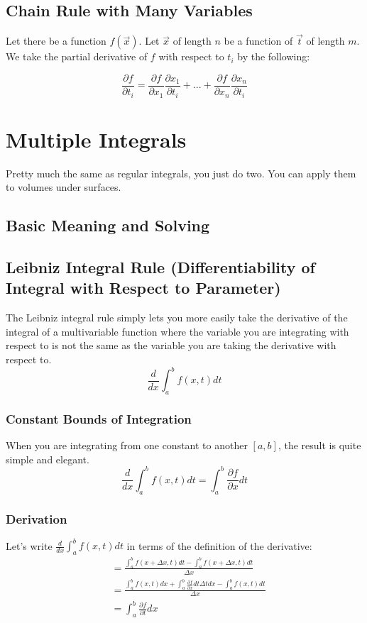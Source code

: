 \documentclass[a4paper,12pt]{report}
\begin{document}
\section{Chain Rule with Many Variables}
Let there be a function $f(\vec{x})$. Let $\vec{x}$ of length $n$ be a function of $\vec{t}$ of length $m$. 
We take the partial derivative of $f$  with respect to $t_i$ by the following:

$$\frac{\partial f}{\partial t_i} = \frac{\partial f}{\partial x_1} \frac{\partial x_1}{\partial t_i} + 
... + \frac{\partial f}{\partial x_n} \frac{\partial x_n}{\partial t_i} $$

\chapter{Multiple Integrals}
Pretty much the same as regular integrals, you just do two. You can apply them to volumes under surfaces.

\section{Basic Meaning and Solving}

\section{Leibniz Integral Rule (Differentiability of Integral with Respect to Parameter)}
The Leibniz integral rule simply lets you more easily take the derivative of the integral of a multivariable
function where the variable you are integrating with respect to is not the same as the variable you are taking
the derivative with respect to.
$$\frac{d}{dx} \int_a^b f(x, t) dt$$

\subsection{Constant Bounds of Integration}
When you are integrating from one constant to another $[a, b]$, the result is quite simple and elegant.
$$\frac{d}{dx} \int_a^b f(x, t) dt = \int_a^b \frac{\partial f}{\partial x} dt$$

\subsection{Derivation}
Let's write $\frac{d}{dx} \int_a^b f(x, t) dt$ in terms of the definition of the derivative:
\begin{align*}
& = \frac{\int_a^b f(x +\Delta x, t)dt - \int_a^b f(x+\Delta x, t)dt}{\Delta x} \\
& = \frac{\int_a^b f(x, t) dx + \int_a^b \frac{\partial f}{\partial x} dt \Delta t dx - \int_a^b f(x, t) dt}{\Delta x} \\
& = \int_a^b \frac{\partial f}{\partial t} dx \\
\label{Constant Bounds}
\end{align*}
\end{document}
